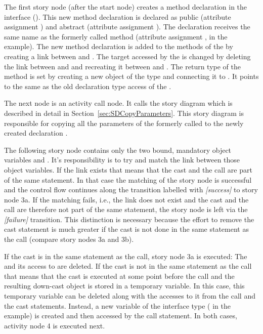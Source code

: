 The first story node (after the start node) creates a method declaration in the interface (). This new method declaration is declared as public (attribute assignment ) and abstract (attribute assignment ). The declaration receives the same name as the formerly called method (attribute assignment ,  in the example). The new method declaration is added to the methods of the  by creating a  link between  and . The target accessed by the  is changed by deleting the link between  and  and recreating it between  and . The return type of the method is set by creating a new object  of the type  and connecting it to . It points to the same  as the old declaration type access of the .

The next node is an activity call node. It calls the story diagram  which is described in detail in Section~\ref{sec:SDCopyParameters}. This story diagram is responsible for copying all the parameters of the formerly called  to the newly created declaration .

The following story node contains only the two bound, mandatory object variables  and . It's responsibility is to try and match the link  between those object variables. If the link exists that means that the cast and the call are part of the same statement. In that case the matching of the story node is successful and the control flow continues along the transition labelled with \emph{[success]} to story node 3a. If the matching fails, i.e., the link does not exist and the cast and the call are therefore not part of the same statement, the story node is left via the \emph{[failure]} transition. This distinction is necessary because the effort to remove the cast statement is much greater if the cast is not done in the same statement as the call (compare story nodes 3a and 3b).

If the cast is in the same statement as the call, story node 3a is executed: The  and its access to  are deleted. If the cast is not in the same statement as the call that means that the cast is executed at some point before the call and the resulting down-cast object is stored in a temporary variable. In this case, this temporary variable can be deleted along with the accesses to it from the call and the cast statements. Instead, a new variable of the interface type ( in the example) is created and then accessed by the call statement. In both cases, activity node 4 is executed next.

